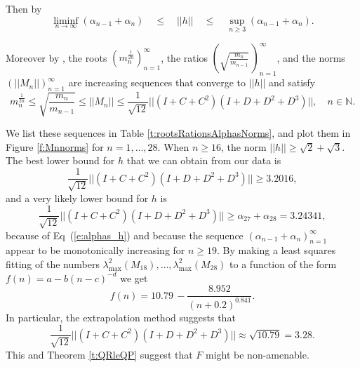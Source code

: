 \documentclass{amsart}
\newcommand{\N}{\mathbb N}
\theoremstyle{definition}
\begin{document}
Then by \cite[Proposition 4.4]{HaagerupRamirezSolano}
  \begin{equation}\label{e:alphas_h}
    \liminf_{n\to\infty}(\alpha_{n-1}+\alpha_n)\quad \le \quad ||h||\quad \le\quad  \sup_{n\ge 3}(\alpha_{n-1}+\alpha_n).
  \end{equation}

Moreover by \cite[Proposition 4.1 and Proposition 4.7]{HaagerupRamirezSolano},
the roots $(m_n^{\frac1{2n}})_{n=1}^{\infty}$, the ratios $(\sqrt{\frac{m_n}{m_{n-1}}}\,)_{n=1}^{\infty}$,
and the norms $(||M_n||)_{n=1}^{\infty}$ are increasing sequences that converge to $||h||$ and satisfy
$$m_n^{\frac1{2n}}\le \sqrt{\frac{m_n}{m_{n-1}}}\le ||M_n||\le \frac1{\sqrt{12}}||(I+C+C^2)(I+D+D^2+D^3)||,\quad n\in \N.$$

We list these sequences in Table \ref{t:rootsRationsAlphasNorms}, and plot them in Figure \ref{f:Mnnorms} for $n=1,\ldots, 28$. 
When $n\ge 16$, the norm $||h||\ge \sqrt{2}+\sqrt{3}$. The best lower bound for $h$ that we can obtain from our data is
$$\frac1{\sqrt{12}}||(I+C+C^2)(I+D+D^2+D^3) ||\ge 3.2016,$$
and a very likely lower bound for $h$ is
$$\frac1{\sqrt{12}}||(I+C+C^2)(I+D+D^2+D^3) ||\ge \alpha_{27}+\alpha_{28}=3.24341,$$
because of Eq~(\ref{e:alphas_h}) and because the sequence $(\alpha_{n-1}+\alpha_n)_{n=1}^\infty$ appear to be monotonically increasing for $n\ge 19$.
By making a least squares fitting of the numbers $\lambda^2_{\max}(M_{18}),\ldots,\lambda^2_{\max}(M_{28})$ to a function of the form $f(n)=a-b(n-c)^{-d}$  we get
$$f(n)={10.79\, -\frac{8.952}{(n+0.2)^{0.841}}}.$$
In particular, the extrapolation method suggests that 
\begin{equation}\label{e:extrapolation3.28}
\frac1{\sqrt{12}}||(I+C+C^2)(I+D+D^2+D^3) ||\approx \sqrt{10.79}=3.28.
\end{equation}
This and Theorem \ref{t:QRleQP} suggest that $F$ might be non-amenable.





 
\end{document}
